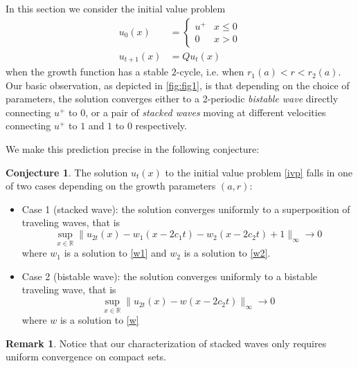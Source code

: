 \documentclass{article}
\theoremstyle{definition}
\newtheorem{remark}[theorem]{Remark}
\newtheorem{conjecture}[theorem]{Conjecture}
\numberwithin{equation}{section}
\begin{document}
In this section we consider the initial value problem
\begin{equation} \label{ivp} \begin{aligned}
u_0(x) &= \begin{cases} u^+ & x \leq 0 \\ 0 & x > 0 \end{cases} \\
u_{t+1}(x) &= Qu_t(x)
\end{aligned} \end{equation}
when the growth function has a stable $2$-cycle, i.e. when $r_1(a) < r < r_2(a)$.
Our basic observation, as depicted in \autoref{fig:fig1}, is that depending on the choice of parameters, the solution converges either to a 2-periodic {\it bistable wave} directly connecting $u^+$ to $0$, or a pair of {\it stacked waves} moving at different velocities connecting $u^+$ to $1$ and $1$ to $0$ respectively.

We make this prediction precise in the following conjecture:
\begin{conjecture}
The solution $u_t(x)$ to the initial value problem \eqref{ivp} falls in one of two cases depending on the growth parameters $(a, r)$:
\begin{itemize}
\item Case 1 (stacked wave): the solution converges uniformly to a superposition of traveling waves, that is
$$ \sup_{x \in \mathbb{R}}\|u_{2t}(x)-w_1(x - 2c_1t)-w_2(x- 2c_2t)+1\|_\infty \to 0 $$
where $w_1$ is a solution to \eqref{w1} and $w_2$ is a solution to \eqref{w2}.
\item Case 2 (bistable wave): the solution converges uniformly to a bistable traveling wave, that is
$$ \sup_{x \in \mathbb{R}}\|u_{2t}(x)-w(x - 2c_2t)\|_\infty \to 0 $$
where $w$ is a solution to \eqref{w}
\end{itemize}
\end{conjecture}

\begin{remark}
Notice that our characterization of stacked waves only requires uniform convergence on compact sets.
\end{remark}



\end{document}
